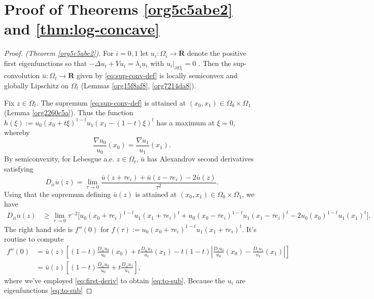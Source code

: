 \documentclass[12pt]{amsart}
\newenvironment{pf}{\begin{proof}}{\end{proof}}
\theoremstyle{definition}
\theoremstyle{remark}
\begin{document}
\section{Proof of Theorems \ref{org5c5abe2} and \ref{thm:log-concave}}
\label{sec:org443bc0d}



\begin{pf}[Proof. (Theorem \ref{org5c5abe2})] For $i=0,1$ let \(u_i : \Omega_i \to \mathbf{R}\)
denote the positive first eigenfunctions so that \(-\Delta u_i + V u_i = \lambda_i u_i\) with $u_i|_{\partial \Omega_i} = 0$ . Then the sup-convolution \(\overline{u} : \Omega_t \to \mathbf{R}\)  given by \eqref{eq:sup-conv-def} is locally semiconvex and globally Lipschitz on $\Omega_t$ (Lemmas \ref{org15f8af8}, \ref{org7214da8}).

Fix $z \in \Omega_t$. The supremum  \eqref{eq:sup-conv-def} is attained at $(x_0,x_1) \in \Omega_0 \times \Omega_1$ (Lemma \ref{org2260c5a}).  Thus
the function $h(\xi) := u_0(x_0 + t\xi)^{1-t}u_1(x_1-(1-t)\xi)^t$ has a maximum at $\xi
= 0$, whereby
  \begin{equation}
    \label{eq:first-deriv} \frac{\nabla u_0}{u_0}(x_0) = \frac{\nabla u_1}{u_1}(x_1).
  \end{equation} By semiconvexity, for Lebesgue a.e. $z \in \Omega_t$, $\bar{u}$ has
Alexandrov second derivatives satisfying
\[ D_{ii}\overline{u}(z) = \lim_{\tau \rightarrow 0}\frac{\overline{u}(z+\tau e_i) +
\overline{u}(z-\tau e_i) - 2\overline{u}(z)}{\tau^2}.
\] Using that the supremum defining $\bar{u}(z)$ is attained at $(x_0,x_1) \in \Omega_0
\times \Omega_1$, we have
  \begin{align*} D_{ii}\overline{u}(z) &\geq \lim_{\tau \rightarrow 0} \tau^{-2}\Big[ u_0(x_0+\tau
e_i)^{1-t}u_1(x_1+\tau e_i)^t + u_0(x_0-\tau e_i)^{1-t}u_1(x_1-\tau e_i)^t -
2u_0(x_0)^{1-t}u_1(x_1)^t\Big].
  \end{align*} The right hand side is $f''(0)$ for $f(\tau) := u_0(x_0+\tau
e_i)^{1-t}u_1(x_1+\tau e_i)^t$. It's routine to compute
  \begin{align} \nonumber f''(0) &=
\bar{u}(z)\left[(1-t)\frac{D_{ii}u_0}{u_0}(x_0) + t \frac{D_{ii}u_1}{u_1}(x_1) -
t(1-t)\left\vert\frac{D_iu_0}{u_0}(x_0) - \frac{D_{i}u_1}{u_1}(x_1) \right\vert
\right]\\
    \label{eq:to-sub} &= \bar{u}(z)\left[ (1-t)\frac{D_{ii}u_0}{u_0} + t
\frac{D_{ii}u_1}{u_1}\right],
  \end{align} where we've employed \eqref{eq:first-deriv} to obtain
\eqref{eq:to-sub}. Because the $u_i$ are eigenfunctions \eqref{eq:to-sub}

\end{pf}
\end{document}
